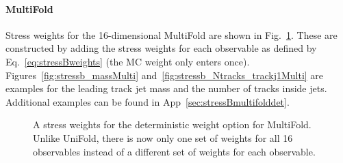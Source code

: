 \clearpage

\paragraph{MultiFold} Stress weights for the 16-dimensional MultiFold are shown in Fig.~\ref{fig:stressb_weightsMulti}.  These are constructed by adding the stress weights for each observable as defined by Eq.~\ref{eq:stressBweights} (the MC weight only enters once).  Figures~\ref{fig:stressb_massMulti} and~\ref{fig:stressb_Ntracks_trackj1Multi} are examples for the leading track jet mass and the number of tracks inside jets.  Additional examples can be found in App~\ref{sec:stressBmultifolddet}.

\begin{figure}[h!]
\centering
{}
\caption{A stress weights for the deterministic weight option for MultiFold.  Unlike UniFold, there is now only one set of weights for all 16 observables instead of a different set of weights for each observable.}
\label{fig:stressb_weightsMulti}
\end{figure}


